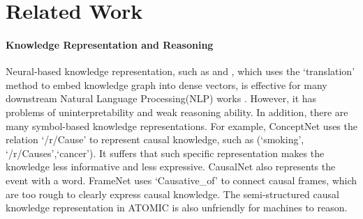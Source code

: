 \section{Related Work}
\label{sec:related}

\paragraph{Knowledge Representation and Reasoning}
Neural-based knowledge representation, such as \cite{Bordes} and \cite{Li2016a}, which uses the `translation' method to embed knowledge graph into dense vectors, is effective for many downstream Natural Language Processing(NLP) works \cite{Wang2017}. However, it has problems of uninterpretability and weak reasoning ability.
In addition, there are many symbol-based knowledge representations.
For example,
 ConceptNet \cite{Speer2016} uses the relation `/r/Cause' to represent causal knowledge, such as (`smoking', `/r/Causes',`cancer'). It suffers that such specific representation makes the knowledge less informative and less expressive. CausalNet\cite{Luo2016a} also represents the event with a word.
 FrameNet\cite{BakerCollinFandFillmoreCharlesJandLowe1997} uses `Causative\_of' to connect causal frames, which are too rough to clearly express causal knowledge.
 The semi-structured causal knowledge representation in ATOMIC \cite{sap2018atomic} is also unfriendly for machines to reason. 

